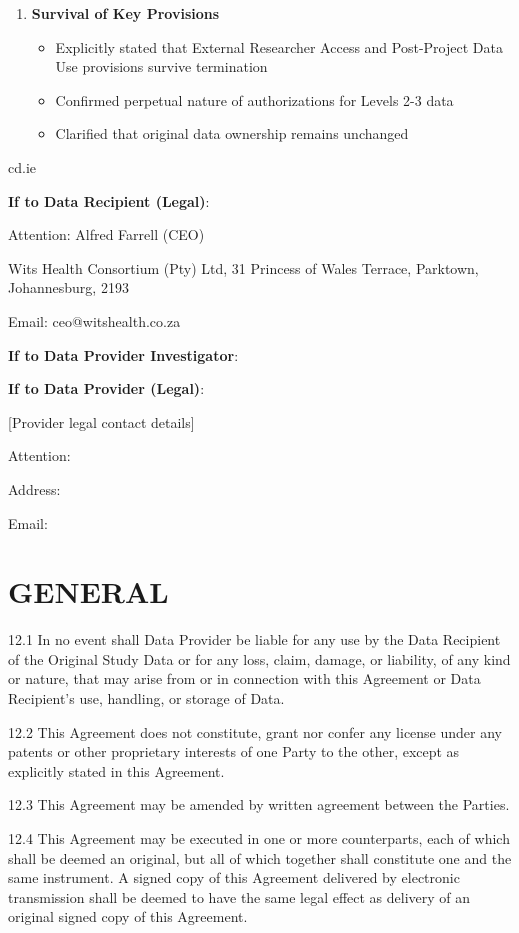 \begin{enumerate}
\item \textbf{Survival of Key Provisions}
   \begin{itemize}
   \item Explicitly stated that External Researcher Access and Post-Project Data Use provisions survive termination
   \item Confirmed perpetual nature of authorizations for Levels 2-3 data
   \item Clarified that original data ownership remains unchanged
   \end{itemize}
\end{enumerate}

cd.ie

\textbf{If to Data Recipient (Legal)}:

Attention: Alfred Farrell (CEO)

Wits Health Consortium (Pty) Ltd, 31 Princess of Wales Terrace, Parktown, Johannesburg, 2193

Email: ceo@witshealth.co.za

\textbf{If to Data Provider Investigator}:

\textbf{If to Data Provider (Legal)}:

[Provider legal contact details]

Attention:

Address:

Email:

\section{GENERAL}

12.1 In no event shall Data Provider be liable for any use by the Data Recipient of the Original Study Data or for any loss, claim, damage, or liability, of any kind or nature, that may arise from or in connection with this Agreement or Data Recipient's use, handling, or storage of Data.

12.2 This Agreement does not constitute, grant nor confer any license under any patents or other proprietary interests of one Party to the other, except as explicitly stated in this Agreement.

12.3 This Agreement may be amended by written agreement between the Parties.

12.4 This Agreement may be executed in one or more counterparts, each of which shall be deemed an original, but all of which together shall constitute one and the same instrument. A signed copy of this Agreement delivered by electronic transmission shall be deemed to have the same legal effect as delivery of an original signed copy of this Agreement.

